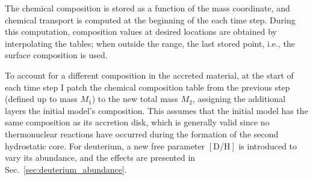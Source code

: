 \documentclass[12pt,a4paper]{article}
\newcommand{\mr}{\mathrm}
\begin{document}
The chemical composition is stored as a function of the mass coordinate, and chemical transport is computed at the beginning of the each time step. During this computation, composition values at desired locations are obtained by interpolating the tables; when outside the range, the last stored point, i.e., the surface composition is used.

To account for a different composition in the accreted material, at the start of each time step I patch the chemical composition table from the previous step (defined up to mass $M_1$) to the new total mass $M_2$, assigning the additional layers the initial model's composition. This assumes that the initial model has the same composition as its accretion disk, which is generally valid since no thermonuclear reactions have occurred during the formation of the second hydrostatic core. For deuterium, a new free parameter $[\mr{D/H}]$ is introduced to vary its abundance, and the effects are presented in Sec.~\ref{sec:deuterium_abundance}.




\end{document}
